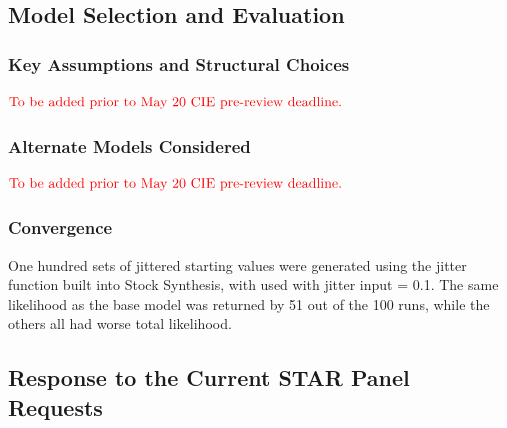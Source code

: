 \documentclass[12pt,]{article}
\begin{document}
\hypertarget{model-selection-and-evaluation}{%
\subsection{Model Selection and
Evaluation}\label{model-selection-and-evaluation}}

\hypertarget{key-assumptions-and-structural-choices}{%
\subsubsection{Key Assumptions and Structural
Choices}\label{key-assumptions-and-structural-choices}}

\textbf{\(\color{red}{\text{To be added prior to May 20 CIE pre-review deadline.}}\)}

\hypertarget{alternate-models-considered}{%
\subsubsection{Alternate Models
Considered}\label{alternate-models-considered}}

\textbf{\(\color{red}{\text{To be added prior to May 20 CIE pre-review deadline.}}\)}

\hypertarget{convergence}{%
\subsubsection{Convergence}\label{convergence}}

One hundred sets of jittered starting values were generated using the
jitter function built into Stock Synthesis, with used with jitter input
= 0.1. The same likelihood as the base model was returned by 51 out of
the 100 runs, while the others all had worse total likelihood.

\hypertarget{response-to-the-current-star-panel-requests}{%
\subsection{Response to the Current STAR Panel
Requests}\label{response-to-the-current-star-panel-requests}}
\end{document}
